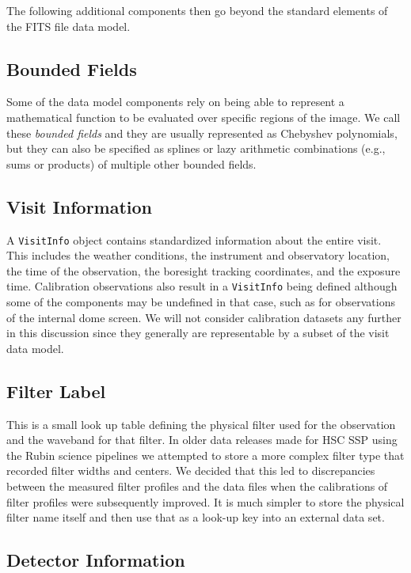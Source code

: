 The following additional components then go beyond the standard elements of the FITS file data model.

\subsection{Bounded Fields}

Some of the data model components rely on being able to represent a mathematical function to be evaluated over specific regions of the image.
We call these \emph{bounded fields} and they are usually represented as Chebyshev polynomials, but they can also be specified as splines or lazy arithmetic combinations (e.g., sums or products) of multiple other bounded fields.

\subsection{Visit Information}

A \texttt{VisitInfo} object contains standardized information about the entire visit.
This includes the weather conditions, the instrument and observatory location, the time of the observation, the boresight tracking coordinates, and the exposure time.
Calibration observations also result in a \texttt{VisitInfo} being defined although some of the components may be undefined in that case, such as for observations of the internal dome screen.
We will not consider calibration datasets any further in this discussion since they generally are representable by a subset of the visit data model.

\subsection{Filter Label}

This is a small look up table defining the physical filter used for the observation and the waveband for that filter.
In older data releases made for HSC SSP\cite{2018PASJ...70S...8A} using the Rubin science pipelines we attempted to store a more complex filter type that recorded filter widths and centers.
We decided that this led to discrepancies between the measured filter profiles and the data files when the calibrations of filter profiles were subsequently improved.
It is much simpler to store the physical filter name itself and then use that as a look-up key into an external data set.

\subsection{Detector Information}

